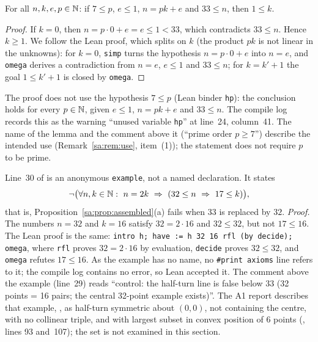 \begin{lemma}\label{sa:lem:big-order}\raggedright
For all $n,k,e,p\in\mathbb N$: if $7\le p$, $e\le1$, $n=pk+e$ and $33\le n$, then $1\le k$.
\end{lemma}

\begin{proof}
If $k=0$, then $n=p\cdot0+e=e\le1<33$, which contradicts $33\le n$. Hence $k\ge1$. We follow the Lean proof, which
splits on $k$ (the product $pk$ is not linear in the unknowns): for $k=0$, \texttt{simp} turns the hypothesis
$n=p\cdot0+e$ into $n=e$, and \texttt{omega} derives a contradiction from $n=e$, $e\le1$ and $33\le n$; for $k=k'+1$
the goal $1\le k'+1$ is closed by \texttt{omega}.
\end{proof}

\begin{remark}\label{sa:rem:big-order}
The proof does not use the hypothesis $7\le p$ (Lean binder \texttt{hp}): the conclusion holds for every $p\in\mathbb N$,
given $e\le1$, $n=pk+e$ and $33\le n$. The compile log records this as the warning ``unused variable \texttt{hp}''
at line~24, column~41. The name of the lemma and the comment above it (``prime order $p\ge7$'') describe the intended
use (Remark~\ref{sa:rem:use}, item~(1)); the statement does not require $p$ to be prime.
\end{remark}

\begin{remark}\label{sa:rem:control}
Line~30 of  is an anonymous \texttt{example}, not a named declaration. It states
\[
\neg\bigl(\forall n,k\in\N:\ n=2k\ \Rightarrow\ (32\le n\ \Rightarrow\ 17\le k)\bigr),
\]
that is, Proposition~\ref{sa:prop:assembled}(a) fails when $33$ is replaced by $32$. \emph{Proof.} The numbers $n=32$
and $k=16$ satisfy $32=2\cdot16$ and $32\le32$, but not $17\le16$. The Lean proof is the same:
\texttt{intro h; have := h 32 16 rfl (by decide); omega}, where \texttt{rfl} proves $32=2\cdot16$ by evaluation,
\texttt{decide} proves $32\le32$, and \texttt{omega} refutes $17\le16$. As the example has no name, no
\texttt{\#print axioms} line refers to it; the compile log contains no error, so Lean accepted it. The comment above
the example (line~29) reads ``control: the half-turn line is false below 33 (32 points = 16 pairs; the central
32-point example exists)''. The A1 report describes that example, , as half-turn
symmetric about $(0,0)$, not containing the centre, with no collinear triple, and with largest subset in convex
position of $6$ points (, lines 93 and~107); the set is not examined in this
section.
\end{remark}

